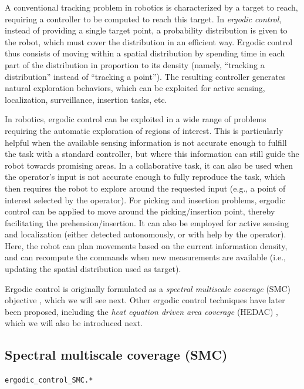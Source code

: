 \documentclass[10pt,a4paper]{article} %
\newcommand{\filename}[1]{\colorbox{rr2}{\color{white}\texttt{#1}}}
\begin{document}
A conventional tracking problem in robotics is characterized by a target to reach, requiring a controller to be computed to reach this target. In \emph{ergodic control}, instead of providing a single target point, a probability distribution is given to the robot, which must cover the distribution in an efficient way. Ergodic control thus consists of moving within a spatial distribution by spending time in each part of the distribution in proportion to its density (namely, ``tracking a distribution'' instead of ``tracking a point''). The resulting controller generates natural exploration behaviors, which can be exploited for active sensing, localization, surveillance, insertion tasks, etc. 

In robotics, ergodic control can be exploited in a wide range of problems requiring the automatic exploration of regions of interest. This is particularly helpful when the available sensing information is not accurate enough to fulfill the task with a standard controller, but where this information can still guide the robot towards promising areas. In a collaborative task, it can also be used when the operator's input is not accurate enough to fully reproduce the task, which then requires the robot to explore around the requested input (e.g., a point of interest selected by the operator). For picking and insertion problems, ergodic control can be applied to move around the picking/insertion point, thereby facilitating the prehension/insertion. It can also be employed for active sensing and localization (either detected autonomously, or with help by the operator). Here, the robot can plan movements based on the current information density, and can recompute the commands when new measurements are available (i.e., updating the spatial distribution used as target). 

Ergodic control is originally formulated as a \emph{spectral multiscale coverage} (SMC) objective \cite{Mathew09}, which we will see next. Other ergodic control techniques have later been proposed, including the \emph{heat equation driven area coverage} (HEDAC) \cite{Ivic17}, which we will also be introduced next.


\subsection{Spectral multiscale coverage (SMC)}\label{sec:SMC}
\begin{flushright}
\filename{ergodic\_control\_SMC.*}
\end{flushright}
\end{document}
